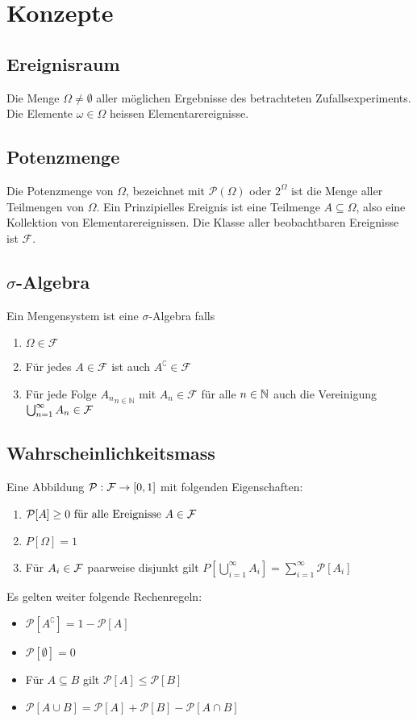 \hypertarget{sec:0}{\section{Konzepte}}
\subsection*{Ereignisraum}
Die Menge $\Omega \neq \emptyset$ aller möglichen Ergebnisse des betrachteten
Zufallsexperiments. Die Elemente $\omega \in \Omega$ heissen
Elementarereignisse.
\subsection*{Potenzmenge}
Die Potenzmenge von $\Omega$, bezeichnet mit $\mathcal{P} (\Omega)$ oder
$2^\Omega$ ist die Menge aller Teilmengen von $\Omega$. Ein Prinzipielles
Ereignis ist eine Teilmenge $A \subseteq \Omega$, also eine Kollektion von
Elementarereignissen. Die Klasse aller beobachtbaren Ereignisse ist
$\mathcal{F}$.
\subsection*{$\sigma$-Algebra}
Ein Mengensystem ist eine $\sigma$-Algebra falls
\begin{enumerate}[label=  (\arabic*)]
  \item $\Omega \in \mathcal{F}$
  \item Für jedes $A \in \mathcal{F}$ ist auch $A^\complement \in \mathcal{F}$
  \item Für jede Folge ${A_n}_{n \in \mathbb{N}}$ mit $A_n \in \mathcal{F}$ für alle $n
          \in \mathbb{N}$ auch die Vereinigung $\bigcup_{n = 1}^\infty A_n \in \mathcal{F}$
\end{enumerate}
\subsection*{Wahrscheinlichkeitsmass}
Eine Abbildung $\mathcal{P}: \mathcal{F} \to [0, 1]$ mit folgenden Eigenschaften:
\begin{enumerate}[label= (\arabic*)]
  \item $\mathcal{P}[A] \geq 0 \text{ für alle Ereignisse } A \in \mathcal{F}$
  \item $P[\Omega] = 1$
  \item Für $A_i \in \mathcal{F}$ paarweise disjunkt gilt $P[\bigcup_{i = 1}^\infty A_i] =
          \sum_{i = 1}^\infty \mathcal{P}[A_i]$
\end{enumerate}
Es gelten weiter folgende Rechenregeln:
\begin{itemize}
  \item $\mathcal{P}[A^\complement] = 1 - \mathcal{P}[A]$
  \item $\mathcal{P}[\emptyset] = 0$
  \item Für $A \subseteq B$ gilt $\mathcal{P}[A] \leq \mathcal{P}[B]$
  \item $\mathcal{P}[A \cup B] = \mathcal{P}[A] + \mathcal{P}[B] - \mathcal{P}[A \cap B]$
\end{itemize}
